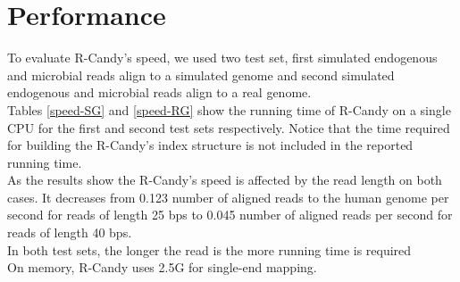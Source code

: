 \documentclass[11pt,a4paper]{report}
\begin{document}
\section{Performance}

To evaluate R-Candy's speed, we used two test set, first simulated endogenous 
and microbial reads align to a simulated genome and second simulated endogenous
and microbial reads align to a real genome.\\

Tables  \ref{speed-SG} and \ref{speed-RG} show the running time of R-Candy on
a single CPU for the first and second test sets respectively.
Notice that the time required for building the R-Candy's index structure is 
not included in the reported running time.\\


As the results  show  the R-Candy's speed is affected by the read length on both cases.
It decreases from 0.123 number of aligned reads to the human genome per second for reads 
of length 25 bps to 0.045 number of aligned reads per second for reads of length 40 bps. \\
In both test sets, the longer the read is the more running time is required\\

On memory, R-Candy uses 2.5G for single-end mapping.\\
\end{document}
